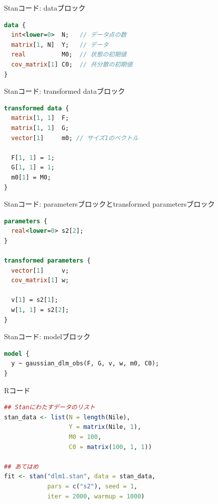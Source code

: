 \documentclass[dvipdfmx,12pt]{beamer}
\begin{document}
\begin{frame}[fragile]{Stanコード: dataブロック}
  \begin{lstlisting}[language=Stan]
data {
  int<lower=0>  N;   // データ点の数
  matrix[1, N]  Y;   // データ
  real          M0;  // 状態の初期値
  cov_matrix[1] C0;  // 共分散の初期値
}
  \end{lstlisting}
\end{frame}

\begin{frame}[fragile]{Stanコード: transformed dataブロック}
  \begin{lstlisting}[language=Stan]
transformed data {
  matrix[1, 1]  F;
  matrix[1, 1]  G;
  vector[1]     m0; // サイズ1のベクトル

  F[1, 1] = 1;
  G[1, 1] = 1;
  m0[1] = M0;
}
  \end{lstlisting}
\end{frame}

\begin{frame}[fragile]{Stanコード: parametersブロックとtransformed parametersブロック}
  \begin{lstlisting}[language=Stan]
parameters {
  real<lower=0> s2[2];
}

transformed parameters {
  vector[1]     v;
  cov_matrix[1] w;

  v[1] = s2[1];
  w[1, 1] = s2[2];
}
  \end{lstlisting}
\end{frame}

\begin{frame}[fragile]{Stanコード: modelブロック}
  \begin{lstlisting}[language=Stan]
model {
  y ~ gaussian_dlm_obs(F, G, v, w, m0, C0);
}
  \end{lstlisting}
\end{frame}

\begin{frame}[fragile]{Rコード}
  \begin{lstlisting}[language=R]
## Stanにわたすデータのリスト
stan_data <- list(N = length(Nile),
                  Y = matrix(Nile, 1),
                  M0 = 100,
                  C0 = matrix(100, 1, 1))

## あてはめ
fit <- stan("dlm1.stan", data = stan_data,
            pars = c("s2"), seed = 1,
            iter = 2000, warmup = 1000)
  \end{lstlisting}
\end{frame}
\end{document}
